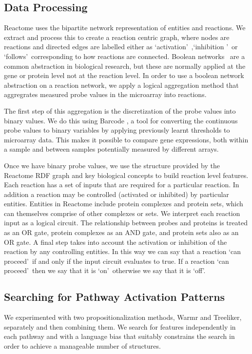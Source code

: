 \documentclass[runningheads,a4paper]{llncs}
\begin{document}
\subsection{Data Processing}
Reactome uses the bipartite network representation of entities and reactions. 
We extract and process this to create a reaction centric graph, where nodes are reactions and directed edges are labelled either as \lq activation\rq\ ,\lq inhibition \rq\ or \lq follows\rq\ corresponding to how reactions are connected. 
Boolean networks~\citep{wang_boolean_2012} are a common abstraction in biological research, but these are normally applied at the gene or protein level not at the reaction level. In order to use a boolean network abstraction on a reaction network, we apply a logical aggregation method that aggregrates measured probe values in the microarray into reactions.

The first step of this aggregation is the discretization of the probe values into binary values. 
We do this using Barcode \citep{mccall_gene_2014}, a tool for converting the continuous probe values to binary variables by applying previously learnt thresholds to microarray data. 
This makes it possible to compare gene expressions, both within a sample and between samples potentially measured by different arrays. 

Once we have binary probe values, we use the structure provided by
the Reactome RDF graph and key biological concepts to build reaction level features. 
Each reaction has a set of inputs that are required for a particular reaction. In addition a reaction may be controlled (activated or inhibited) by particular entities. 
Entities in Reactome include protein complexes and protein sets, which can themselves comprise of other complexes or sets. 
We interpret each reaction input as a logical circuit. The relationship between probes and proteins is treated as an OR gate, protein complexes as an AND gate, and protein sets also as an OR gate. 
A final step takes into account the activation or inhibition of the reaction by any controlling entities. 
In this way we can say that a reaction \lq can proceed\rq\ if and only if the input circuit evaluates to true. 
If a reaction \lq can proceed\rq\ then we say that it is \lq on\rq\ otherwise we say that it is \lq off\rq. %

\subsection{Searching for Pathway Activation Patterns}
We experimented with two propositionalization methods, Warmr and Treeliker, separately and then combining them. We search for features independently in each pathway and with a language bias that suitably constrains the search in order to achieve a manageable number of structures. 
\end{document}
